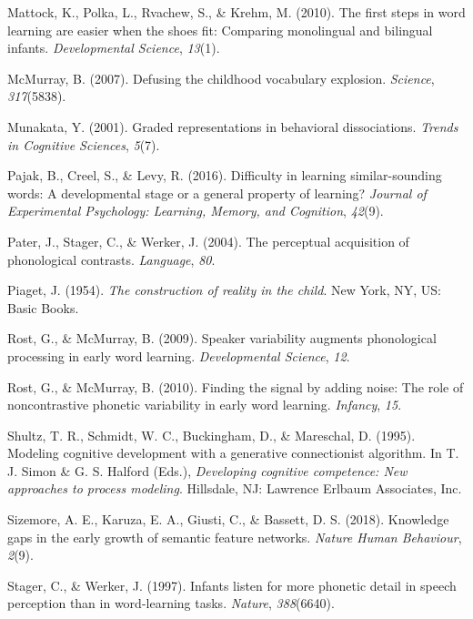 \documentclass[english,,man]{apa6}
\begin{document}
\leavevmode\hypertarget{ref-Mattock2010}{}%
Mattock, K., Polka, L., Rvachew, S., \& Krehm, M. (2010). The first steps in word learning are easier when the shoes fit: Comparing monolingual and bilingual infants. \emph{Developmental Science}, \emph{13}(1).

\leavevmode\hypertarget{ref-McMurray2007}{}%
McMurray, B. (2007). Defusing the childhood vocabulary explosion. \emph{Science}, \emph{317}(5838).

\leavevmode\hypertarget{ref-Munakata2001}{}%
Munakata, Y. (2001). Graded representations in behavioral dissociations. \emph{Trends in Cognitive Sciences}, \emph{5}(7).

\leavevmode\hypertarget{ref-pajak2016}{}%
Pajak, B., Creel, S., \& Levy, R. (2016). Difficulty in learning similar-sounding words: A developmental stage or a general property of learning? \emph{Journal of Experimental Psychology: Learning, Memory, and Cognition}, \emph{42}(9).

\leavevmode\hypertarget{ref-pater2004}{}%
Pater, J., Stager, C., \& Werker, J. (2004). The perceptual acquisition of phonological contrasts. \emph{Language}, \emph{80}.

\leavevmode\hypertarget{ref-piaget1954}{}%
Piaget, J. (1954). \emph{The construction of reality in the child}. New York, NY, US: Basic Books.

\leavevmode\hypertarget{ref-rost2009}{}%
Rost, G., \& McMurray, B. (2009). Speaker variability augments phonological processing in early word learning. \emph{Developmental Science}, \emph{12}.

\leavevmode\hypertarget{ref-rost2010}{}%
Rost, G., \& McMurray, B. (2010). Finding the signal by adding noise: The role of noncontrastive phonetic variability in early word learning. \emph{Infancy}, \emph{15}.

\leavevmode\hypertarget{ref-shultz1995}{}%
Shultz, T. R., Schmidt, W. C., Buckingham, D., \& Mareschal, D. (1995). Modeling cognitive development with a generative connectionist algorithm. In T. J. Simon \& G. S. Halford (Eds.), \emph{Developing cognitive competence: New approaches to process modeling}. Hillsdale, NJ: Lawrence Erlbaum Associates, Inc.

\leavevmode\hypertarget{ref-sizemore2018}{}%
Sizemore, A. E., Karuza, E. A., Giusti, C., \& Bassett, D. S. (2018). Knowledge gaps in the early growth of semantic feature networks. \emph{Nature Human Behaviour}, \emph{2}(9).

\leavevmode\hypertarget{ref-stager1997}{}%
Stager, C., \& Werker, J. (1997). Infants listen for more phonetic detail in speech perception than in word-learning tasks. \emph{Nature}, \emph{388}(6640).
\end{document}
